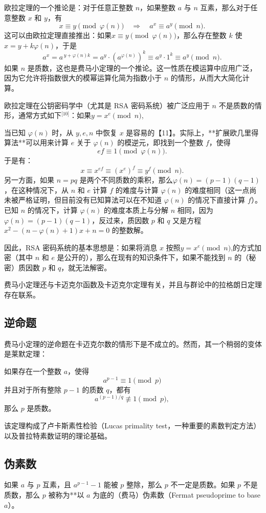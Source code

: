 欧拉定理的一个推论是：对于任意正整数 $n$，如果整数 $a$ 与 $n$ 互素，那么对于任意整数 $x$ 和 $y$，有
$$
x \equiv y \pmod{\varphi(n)} \quad \Rightarrow \quad a^x \equiv a^y \pmod{n}.~
$$
这可以由欧拉定理直接推出：如果$x \equiv y \pmod{\varphi(n)}$，那么存在整数 $k$ 使 $x = y + k\varphi(n)$，于是
$$
a^x = a^{\,y + \varphi(n)k} = a^y \cdot \left(a^{\varphi(n)}\right)^k \equiv a^y \cdot 1^k \equiv a^y \pmod{n}.~
$$
如果 $n$ 是质数，这也是费马小定理的一个推论。这一性质在模运算中应用广泛，因为它允许将指数很大的模幂运算化简为指数小于 $n$ 的情形，从而大大简化计算。

欧拉定理在公钥密码学中（尤其是 RSA 密码系统）被广泛应用于 $n$ 不是质数的情形，通常方式如下\(^\text{[10]}\)：如果$y = x^e \pmod{n}$,

当已知 $\varphi(n)$ 时，从 $y, e, n$ 中恢复 $x$ 是容易的【11】。实际上，**扩展欧几里得算法**可以用来计算 $e$ 关于 $\varphi(n)$ 的模逆元，即找到一个整数 $f$，使得
$$
ef \equiv 1 \pmod{\varphi(n)}.~
$$
于是有：
$$
x \equiv x^{ef} \equiv (x^e)^f \equiv y^f \pmod{n}.~
$$
另一方面，如果 $n = pq$ 是两个不同质数的乘积，那么$\varphi(n) = (p - 1)(q - 1)$，在这种情况下，从 $n$ 和 $e$ 计算 $f$ 的难度与计算 $\varphi(n)$ 的难度相同（这一点尚未被严格证明，但目前没有已知算法可以在不知道 $\varphi(n)$ 的情况下直接计算 $f$）。已知 $n$ 的情况下，计算 $\varphi(n)$ 的难度本质上与分解 $n$ 相同，因为$\varphi(n) = (p - 1)(q - 1)$，反过来，质因数 $p$ 和 $q$ 又是方程$x^2 - (n - \varphi(n) + 1)x + n = 0$
的整数解。

因此，RSA 密码系统的基本思想是：如果将消息 $x$ 按照$y = x^e \pmod{n}$,的方式加密（其中 $n$ 和 $e$ 是公开的），那么在现有的知识条件下，如果不能找到 $n$ 的（秘密）质因数 $p$ 和 $q$，就无法解密。

费马小定理还与卡迈克尔函数及卡迈克尔定理有关，并且与群论中的拉格朗日定理存在联系。
\subsection{逆命题}
费马小定理的逆命题在卡迈克尔数的情形下是不成立的。然而，其一个稍弱的变体是莱默定理：

如果存在一个整数 $a$，使得
$$
a^{p-1} \equiv 1 \pmod{p}~
$$
并且对于所有整除 $p - 1$ 的质数 $q$，都有
$$
a^{(p-1)/q} \not\equiv 1 \pmod{p},~
$$
那么 $p$ 是质数。

该定理构成了卢卡斯素性检验（Lucas primality test，一种重要的素数判定方法）以及普拉特素数证明的理论基础。
\subsection{伪素数}
如果 $a$ 与 $p$ 互素，且 $a^{p-1} - 1$ 能被 $p$ 整除，那么 $p$ 不一定是质数。如果 $p$ 不是质数，那么 $p$ 被称为**以 $a$ 为底的（费马）伪素数（Fermat pseudoprime to base $a$）。

